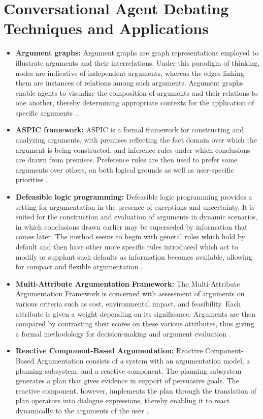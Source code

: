 \documentclass[conference]{IEEEtran}
\begin{document}
\section{Conversational Agent Debating Techniques and Applications}
\begin{itemize}
    \item \textbf{Argument graphs:} Argument graphs are graph representations employed to illustrate arguments and their interrelations. Under this paradigm of thinking, nodes are indicative of independent arguments, whereas the edges linking them are instances of relations among such arguments. Argument graphs enable agents to visualize the composition of arguments and their relations to one another, thereby determining appropriate contexts for the application of specific arguments \cite{b4}\cite{b6}..
    
    \item \textbf{ASPIC framework:} ASPIC is a formal framework for constructing and analyzing arguments, with premises reflecting the fact domain over which the argument is being constructed, and inference rules under which conclusions are drawn from premises. Preference rules are then used to prefer some arguments over others, on both logical grounds as well as user-specific priorities \cite{b6}.
    
    \item \textbf{Defeasible logic programming:} Defeasible logic programming provides a setting for argumentation in the presence of exceptions and uncertainty. It is suited for the construction and evaluation of arguments in dynamic scenarios, in which conclusions drawn earlier may be superseded by information that comes later. The method seems to begin with general rules which hold by default and then have other more specific rules introduced which act to modify or supplant such defaults as information becomes available, allowing for compact and flexible argumentation \cite{b6}.
    
    \item \textbf{Multi-Attribute Argumentation Framework:} The Multi-Attribute Argumentation Framework is concerned with assessment of arguments on various criteria such as cost, environmental impact, and feasibility. Each attribute is given a weight depending on its significance. Arguments are then compared by contrasting their scores on these various attributes, thus giving a formal methodology for decision-making and argument evaluation \cite{b6}.
    
    \item \textbf{Reactive Component-Based Argumentation:} Reactive Component-Based Argumentation consists of a system with an argumentation model, a planning subsystem, and a reactive component. The planning subsystem generates a plan that gives evidence in support of persuasive goals. The reactive component, however, implements the plan through the translation of plan operators into dialogue expressions, thereby enabling it to react dynamically to the arguments of the user \cite{b7}.
    

\end{itemize}
\end{document}

